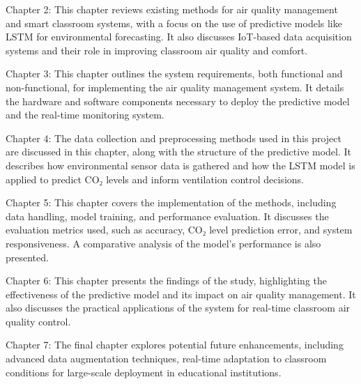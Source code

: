 Chapter 2: This chapter reviews existing methods for air quality management and smart classroom systems, with a focus on the use of predictive models like LSTM for environmental forecasting. It also discusses IoT-based data acquisition systems and their role in improving classroom air quality and comfort.

Chapter 3: This chapter outlines the system requirements, both functional and non-functional, for implementing the air quality management system. It details the hardware and software components necessary to deploy the predictive model and the real-time monitoring system.

Chapter 4: The data collection and preprocessing methods used in this project are discussed in this chapter, along with the structure of the predictive model. It describes how environmental sensor data is gathered and how the LSTM model is applied to predict CO₂ levels and inform ventilation control decisions.

Chapter 5: This chapter covers the implementation of the methods, including data handling, model training, and performance evaluation. It discusses the evaluation metrics used, such as accuracy, CO₂ level prediction error, and system responsiveness. A comparative analysis of the model's performance is also presented.

Chapter 6: This chapter presents the findings of the study, highlighting the effectiveness of the predictive model and its impact on air quality management. It also discusses the practical applications of the system for real-time classroom air quality control.

Chapter 7: The final chapter explores potential future enhancements, including advanced data augmentation techniques, real-time adaptation to classroom conditions for large-scale deployment in educational institutions.